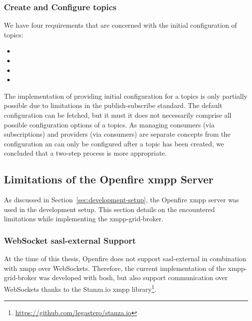 \subsubsection{Create and Configure \glspl{topic}}

We have four requirements that are concerned with the initial configuration of \glspl{topic}:
\begin{itemize}
  \item {}
  \item {}
  \item {}
  \item {}
\end{itemize}

The implementation of providing initial configuration for a \glspl{topic} is only partially possible due to limitations in the \gls{publish-subscribe} standard. The default configuration can be fetched, but it must it does not necessarily comprise all possible configuration options of a \glspl{topic}.
As managing consumers (via subscriptions) and providers (via consumers) are separate concepts from the configuration an can only be configured after a \gls{topic} has been created, we concluded that a two-step process is more appropriate. ~\cite{xep-0060}

\subsection{Limitations of the Openfire \gls{xmpp} Server}\label{sec:limitations-of-the-openfire-xmpp-server}

As discussed in Section~\ref{sec:development-setup}, the Openfire \gls{xmpp} server was used in the development setup. This section details on the encountered limitations while implementing the \gls{xmpp-grid-broker}.

\subsubsection{WebSocket \gls{sasl-external} Support}

At the time of this thesis, Openfire does not support \gls{sasl-external} in combination with \gls{xmpp} over WebSockets.
Therefore, the current implementation of the \gls{xmpp-grid-broker} was developed with \gls{bosh}, but also support communication over WebSockets thanks to the Stanza.io \gls{xmpp} library\footnote{\url{https://github.com/legastero/stanza.io}}.

